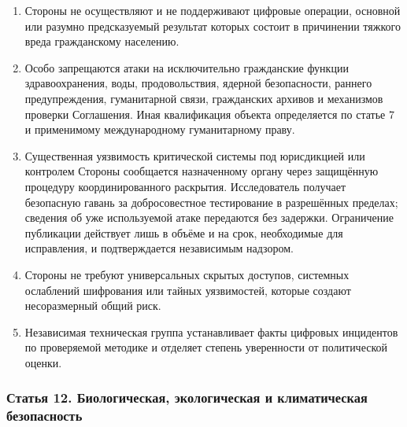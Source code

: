 \documentclass[
  russian,
  11pt,
  a4paper,
]{article}
\providecommand{\tightlist}{%
  \setlength{\itemsep}{0pt}\setlength{\parskip}{0pt}}
\begin{document}
\begin{enumerate}
\def\labelenumi{\arabic{enumi}.}
\tightlist
\item
  Стороны не осуществляют и не поддерживают цифровые операции, основной
  или разумно предсказуемый результат которых состоит в причинении
  тяжкого вреда гражданскому населению.
\item
  Особо запрещаются атаки на исключительно гражданские функции
  здравоохранения, воды, продовольствия, ядерной безопасности, раннего
  предупреждения, гуманитарной связи, гражданских архивов и механизмов
  проверки Соглашения. Иная квалификация объекта определяется по статье
  7 и применимому международному гуманитарному праву.
\item
  Существенная уязвимость критической системы под юрисдикцией или
  контролем Стороны сообщается назначенному органу через защищённую
  процедуру координированного раскрытия. Исследователь получает
  безопасную гавань за добросовестное тестирование в разрешённых
  пределах; сведения об уже используемой атаке передаются без задержки.
  Ограничение публикации действует лишь в объёме и на срок, необходимые
  для исправления, и подтверждается независимым надзором.
\item
  Стороны не требуют универсальных скрытых доступов, системных
  ослаблений шифрования или тайных уязвимостей, которые создают
  несоразмерный общий риск.
\item
  Независимая техническая группа устанавливает факты цифровых инцидентов
  по проверяемой методике и отделяет степень уверенности от политической
  оценки.
\end{enumerate}

\subsubsection{Статья 12. Биологическая, экологическая и климатическая
безопасность}\label{ux441ux442ux430ux442ux44cux44f-12-ux431ux438ux43eux43bux43eux433ux438ux447ux435ux441ux43aux430ux44f-ux44dux43aux43eux43bux43eux433ux438ux447ux435ux441ux43aux430ux44f-ux438-ux43aux43bux438ux43cux430ux442ux438ux447ux435ux441ux43aux430ux44f-ux431ux435ux437ux43eux43fux430ux441ux43dux43eux441ux442ux44c}
\end{document}
